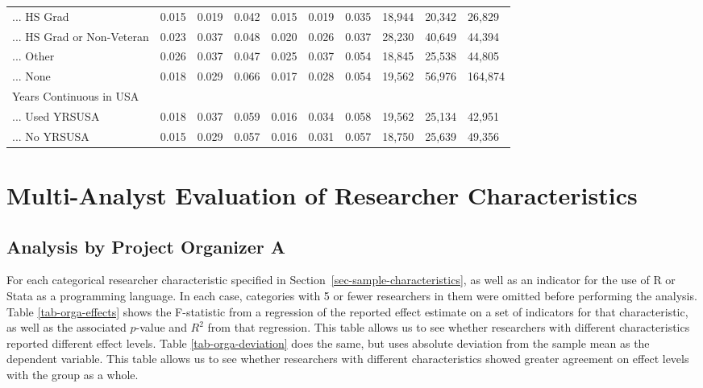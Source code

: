 \documentclass[
  letterpaper,
  DIV=11,
  numbers=noendperiod]{scrartcl}
\begin{document}
\begin{table}[!htbp]
{\begin{tabular}{llllllllll}
... HS Grad & 0.015 & 0.019 & 0.042 & 0.015 & 0.019 & 0.035 & 18,944 & 20,342 & 26,829 \\ 
... HS Grad or Non-Veteran & 0.023 & 0.037 & 0.048 & 0.020 & 0.026 & 0.037 & 28,230 & 40,649 & 44,394 \\ 
... Other & 0.026 & 0.037 & 0.047 & 0.025 & 0.037 & 0.054 & 18,845 & 25,538 & 44,805 \\ 
... None & 0.018 & 0.029 & 0.066 & 0.017 & 0.028 & 0.054 & 19,562 & 56,976 & 164,874 \\ 
Years Continuous in USA &  &  &  &  &  &  &  &  &  \\ 
... Used YRSUSA & 0.018 & 0.037 & 0.059 & 0.016 & 0.034 & 0.058 & 19,562 & 25,134 & 42,951 \\ 
... No YRSUSA & 0.015 & 0.029 & 0.057 & 0.016 & 0.031 & 0.057 & 18,750 & 25,639 & 49,356\\ 
\hline
\hline
\end{tabular}
}
\end{table}

\hypertarget{multi-analyst-evaluation-of-researcher-characteristics}{%
\section*{Multi-Analyst Evaluation of Researcher
Characteristics}\label{multi-analyst-evaluation-of-researcher-characteristics}}

\hypertarget{analysis-by-project-organizer-a}{%
\subsection{Analysis by Project Organizer
A}\label{analysis-by-project-organizer-a}}

For each categorical researcher characteristic specified in
Section~\ref{sec-sample-characteristics}, as well as an indicator for
the use of R or Stata as a programming language. In each case,
categories with 5 or fewer researchers in them were omitted before
performing the analysis. Table \ref{tab-orga-effects} shows the
F-statistic from a regression of the reported effect estimate on a set
of indicators for that characteristic, as well as the associated
\(p\)-value and \(R^2\) from that regression. This table allows us to
see whether researchers with different characteristics reported
different effect levels. Table \ref{tab-orga-deviation} does the same,
but uses absolute deviation from the sample mean as the dependent
variable. This table allows us to see whether researchers with different
characteristics showed greater agreement on effect levels with the group
as a whole.
\end{document}
